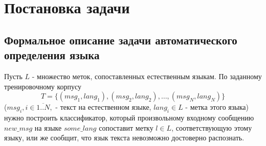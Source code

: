 \documentclass[a4paper, 14pt]{article}
\begin{document}
	        
\section{Постановка задачи}
		\subsection{Формальное описание задачи автоматического определения языка}
		Пусть $L$ - множество меток, сопоставленных естественным языкам.
		По заданному тренировочному корпусу $$ T = \{(msg_{1}, lang_{1}), (msg_{2}, lang_{2}), \ldots, (msg_{N}, lang_{N}) \} $$
		($msg_{i}, i \in \overline{1..N},$ - текст на естественном языке, $lang_{i} \in L$ - метка этого языка) нужно построить классификатор,
		который произвольному входному сообщению $new\_msg$ на языке $some\_lang$ сопоставит метку $l \in L$, соответствующую этому языку,
		 или же сообщит, что язык текста невозможно достоверно распознать.
\end{document}

